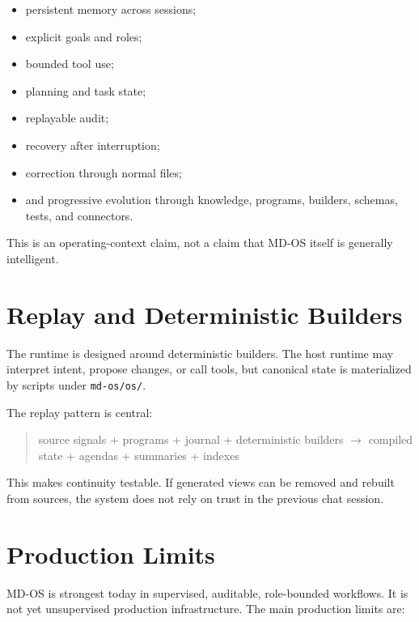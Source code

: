 \documentclass[11pt,a4paper]{article}
\newcommand{\code}[1]{\texttt{#1}}
\begin{document}
\begin{itemize}
  \item persistent memory across sessions;
  \item explicit goals and roles;
  \item bounded tool use;
  \item planning and task state;
  \item replayable audit;
  \item recovery after interruption;
  \item correction through normal files;
  \item and progressive evolution through knowledge, programs, builders,
  schemas, tests, and connectors.
\end{itemize}

This is an operating-context claim, not a claim that MD-OS itself is generally
intelligent.

\section{Replay and Deterministic Builders}

The runtime is designed around deterministic builders. The host runtime may
interpret intent, propose changes, or call tools, but canonical state is
materialized by scripts under \code{md-os/os/}.

The replay pattern is central:

\begin{quote}
source signals + programs + journal + deterministic builders $\rightarrow$
compiled state + agendas + summaries + indexes
\end{quote}

This makes continuity testable. If generated views can be removed and rebuilt
from sources, the system does not rely on trust in the previous chat session.

\section{Production Limits}

MD-OS is strongest today in supervised, auditable, role-bounded workflows. It
is not yet unsupervised production infrastructure. The main production limits
are:
\end{document}
